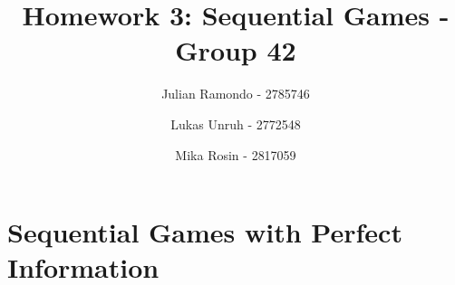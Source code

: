 \documentclass[11pt]{article}
\title{Homework 3: Sequential Games - Group 42}
\author{Julian Ramondo - 2785746 \and Lukas Unruh - 2772548 \and Mika Rosin - 2817059}
\begin{document}
    \maketitle

    \setcounter{section}{2}
    \section{Sequential Games with Perfect Information}

    
    
\end{document}
